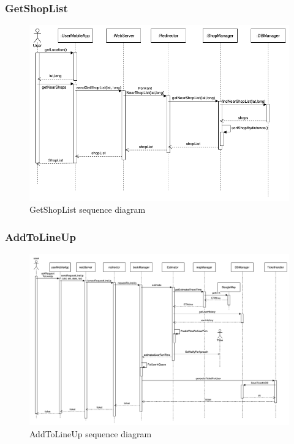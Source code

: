 \subsubsection{GetShopList}
\begin{figure}[H]
  \centering
  \includegraphics[width=\textwidth, keepaspectratio]{images/sequences/GetShopList.png}
  \caption{GetShopList sequence diagram}
\end{figure}
\vspace{2cm}

\subsubsection{AddToLineUp}
\begin{figure}[H]
  \centering
  \includegraphics[width=0.9\textheight, angle=90, keepaspectratio]{images/sequences/AddToLineUp.png}
  \caption{AddToLineUp sequence diagram}
\end{figure}
\vspace{2cm}

